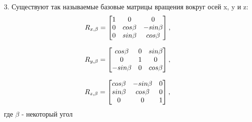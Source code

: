 3. Существуют так называемые базовые матрицы вращения вокруг осей x, y и z:
\begin{equation}\label{eq:model}
R_{x, \beta} = 
     \begin{bmatrix}
    1 & 0 & 0\\
    0 & cos\beta & -sin\beta\\
    0 & sin\beta & cos\beta\\
    \end{bmatrix}
    , \\
\end{equation} 

\begin{equation}\label{eq:model}
R_{y, \beta} = 
     \begin{bmatrix}
    cos\beta & 0 & sin\beta\\
    0 & 1 & 0\\
    -sin\beta & 0 & cos\beta\\
    \end{bmatrix}
    , \\
\end{equation} 

\begin{equation}\label{eq:model}
R_{z, \beta} = 
     \begin{bmatrix}
   
    cos\beta & -sin\beta & 0\\
    sin\beta & cos\beta & 0\\
    0 & 0 & 1\\
    \end{bmatrix}
    , \\
\end{equation} 
где $\beta$ - некоторый угол\\

